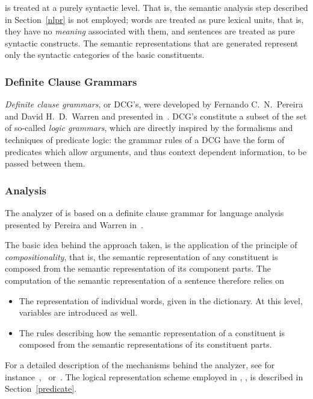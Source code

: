 {\nal} is treated at a purely syntactic level. That is, the semantic
analysis step described in Section~\ref{nlpr} is not employed; words
are treated as pure lexical units, that is, they have no {\em
meaning\/} associated with them, and sentences are treated as pure
syntactic constructs. The semantic representations that are generated
represent only the syntactic categories of the basic constituents.

\subsubsection{Definite Clause Grammars}

{\em Definite clause grammars\/}, or DCG's, were developed by Fernando
C.\ N.\ Pereira and David H.\ D.\ Warren and presented in~\cite{dcg}.
DCG's constitute a subset of the set of so-called {\em logic
grammars\/}, which are directly inspired by the formalisms and
techniques of predicate logic: the grammar rules of a DCG have the
form of predicates which allow arguments, and thus context dependent
information, to be passed between them.

\subsubsection{Analysis}

The analyzer of {\nash} is based on a definite clause grammar for
language analysis presented by Pereira and Warren in~\cite{dcg}.

The basic idea behind the approach taken, is the application of the
principle of {\em compositionality\/}, that is, the semantic
representation of any constituent is composed from the semantic
representation of its component parts. The computation of the semantic
representation of a sentence therefore relies on

\begin{itemize}
  \item The representation of individual words, given in the
    dictionary. At this level, variables are introduced as well.
  \item The rules describing how the semantic representation of a
    constituent is composed from the semantic representations of its
    constituent parts.
\end{itemize}
For a detailed description of the mechanisms behind the analyzer, see
for instance~\cite{gal},~\cite{pereira} or~\cite{dcg}. The logical
representation scheme employed in {\nash}, {\niks}, is described in
Section~\ref{predicate}.

